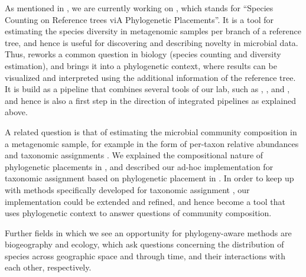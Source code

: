 As mentioned in , we are currently working on ,
which stands for ``Species Counting on Reference trees viA Phylogenetic Placements''.
It is a tool for estimating the species diversity in metagenomic samples per branch of a reference tree,
and hence is useful for discovering and describing novelty in microbial data.
Thus,  reworks a common question in biology (species counting and diversity estimation),
and brings it into a phylogenetic context,
where results can be visualized and interpreted using the additional information of the reference tree.
It is build as a pipeline that combines several tools of our lab, such as
 \cite{Barbera2018},  \cite{Morel2018}, and  \cite{Kapli2017},
and hence is also a first step in the direction of integrated pipelines as explained above.


A related question is that of estimating the microbial community composition in a metagenomic sample,
for example in the form of per-taxon relative abundances and taxonomic assignments \cite{Lindgreen2016}.
We explained the compositional nature of phylogenetic placements in
,
and described our ad-hoc implementation for taxonomic assignment based on phylogenetic placement in %
.
In order to keep up with methods specifically developed for taxonomic assignment
\cite{Lindgreen2016,Sczyrba2017,Almeida2018},
our implementation could be extended and refined,
and hence become a tool that uses phylogenetic context to answer questions of community composition.


Further fields in which we see an opportunity for phylogeny-aware methods are biogeography and ecology,
which ask questions concerning the distribution of species across geographic space and through time,
and their interactions with each other, respectively.

